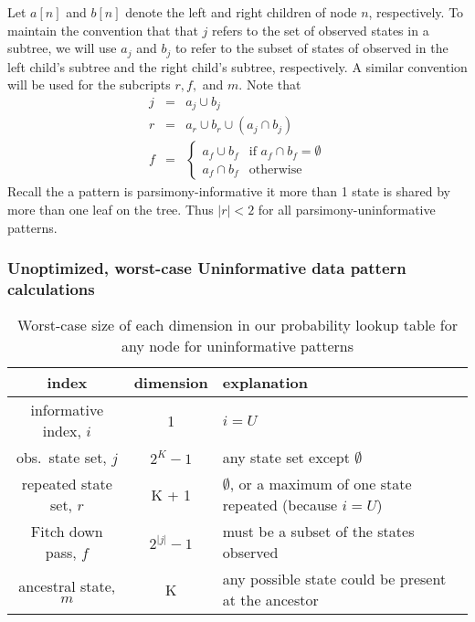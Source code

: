 \documentclass[11pt]{article}
\newcommand{\uninform}{\ensuremath{U}\xspace}
\newcommand{\leftChild}[1]{\ensuremath{a\left[#1\right]}\xspace} %
\newcommand{\rightChild}[1]{\ensuremath{b\left[#1\right]}\xspace}%
\begin{document}
Let \leftChild{n} and \rightChild{n} denote the left and right children of node $n$, respectively.
To maintain the convention that that $j$ refers to the set of observed states in a subtree, we will use $a_j$ and $b_j$ to refer to the subset of states of observed in the left child's subtree and the right child's subtree, respectively.
A similar convention will be used for the subcripts $r,f,$ and $m$.
Note that 
\begin{eqnarray}
	j & = &  a_j \cup b_j \\
	r & = & a_r \cup b_r\cup(a_j \cap b_j)\\
	f & = & \left\{\begin{array}{cl}
				a_f \cup b_f & \mbox{if } a_f \cap b_f =\emptyset \\
				a_f \cap b_f & \mbox{otherwise}
		  \end{array}\right.
\end{eqnarray}
Recall the a pattern is parsimony-informative it more than 1 state is shared by more than one leaf on the tree.
Thus $|r| < 2$ for all parsimony-uninformative patterns.



\subsubsection{Unoptimized, worst-case Uninformative data pattern calculations}
\begin{table}[htdp]
\caption{Worst-case size of each dimension in our probability lookup table for any node for uninformative patterns}\label{unoptUninform}
\begin{center}
\begin{tabular}{|c|c|p{4in}|}
\hline
index & dimension & explanation\\
\hline
informative index, $i$ & 1 & $i=\uninform$ \\
obs.\ state set, $j$ & $2^K-1$ & any state set except $\emptyset$\\
repeated state set, $r$ & K + 1 & $\emptyset$, or a maximum of one state repeated (because $i=\uninform$)\\
Fitch down pass, $f$ & $2^{|j|}-1$ & must be a subset of the states observed  \\
ancestral state, $m$ & K & any possible state could be present at the ancestor \\
\hline
\end{tabular}
\end{center}
\label{default}
\end{table}%
\end{document}
